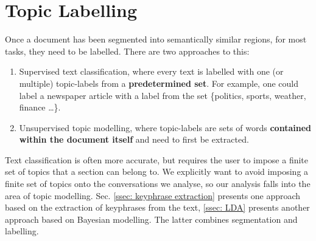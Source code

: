 \section{Topic Labelling \label{ssec: topic labelling}}

Once a document has been segmented into semantically similar regions, for most tasks, they need to be labelled. There are two approaches to this:

\begin{enumerate}
    \item Supervised text classification, where every text is labelled with one (or multiple) topic-labels from a \textbf{predetermined set}\cite{surverTextClassification}. For example, one could label a newspaper article with a label from the set \{politics, sports, weather, finance \dots\}.
    \item Unsupervised topic modelling, where topic-labels are sets of words \textbf{contained within the document itself} and need to first be extracted.
\end{enumerate}

Text classification is often more accurate, but requires the user to impose a finite set of topics that a section can belong to. We explicitly want to avoid imposing a finite set of topics onto the conversations we analyse, so our analysis falls into the area of topic modelling. Sec. \ref{ssec: keyphrase extraction} presents one approach based on the extraction of \glspl{keyphrase} from the text, \ref{ssec: LDA} presents another approach based on Bayesian modelling. The latter combines segmentation and labelling.
